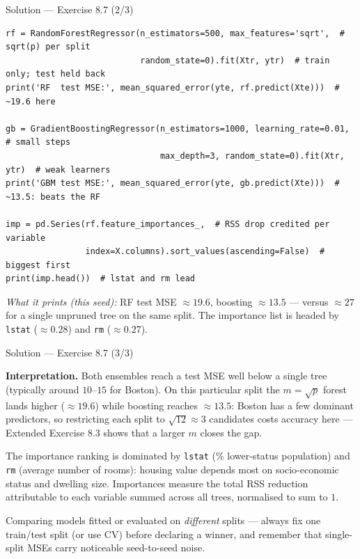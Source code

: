 \documentclass[aspectratio=169,11pt]{beamer}
\begin{document}
\begin{frame}[fragile]{Solution --- Exercise 8.7 (2/3)}
\begin{solutionbox}
\begin{lstlisting}[basicstyle=\ttfamily\scriptsize]
rf = RandomForestRegressor(n_estimators=500, max_features='sqrt',  # sqrt(p) per split
                           random_state=0).fit(Xtr, ytr)  # train only; test held back
print('RF  test MSE:', mean_squared_error(yte, rf.predict(Xte)))  # ~19.6 here

gb = GradientBoostingRegressor(n_estimators=1000, learning_rate=0.01,  # small steps
                               max_depth=3, random_state=0).fit(Xtr, ytr)  # weak learners
print('GBM test MSE:', mean_squared_error(yte, gb.predict(Xte)))  # ~13.5: beats the RF

imp = pd.Series(rf.feature_importances_,  # RSS drop credited per variable
                index=X.columns).sort_values(ascending=False)  # biggest first
print(imp.head())  # lstat and rm lead
\end{lstlisting}
\emph{What it prints (this seed):} RF test MSE $\approx19.6$, boosting $\approx13.5$ --- versus $\approx27$ for a single unpruned tree on the same split. The importance list is headed by \texttt{lstat} ($\approx0.28$) and \texttt{rm} ($\approx0.27$).
\end{solutionbox}
\end{frame}

\begin{frame}{Solution --- Exercise 8.7 (3/3)}
\begin{solutionbox}
\textbf{Interpretation.} Both ensembles reach a test MSE well below a single tree (typically around $10$--$15$ for Boston). On this particular split the $m=\sqrt p$ forest lands higher ($\approx19.6$) while boosting reaches $\approx13.5$: Boston has a few dominant predictors, so restricting each split to $\sqrt{12}\approx3$ candidates costs accuracy here --- Extended Exercise 8.3 shows that a larger $m$ closes the gap.

\medskip
The importance ranking is dominated by \texttt{lstat} (\% lower-status population) and \texttt{rm} (average number of rooms): housing value depends most on socio-economic status and dwelling size. Importances measure the total RSS reduction attributable to each variable summed across all trees, normalised to sum to $1$.
\end{solutionbox}
\begin{mistake}
Comparing models fitted or evaluated on \emph{different} splits --- always fix one train/test split (or use CV) before declaring a winner, and remember that single-split MSEs carry noticeable seed-to-seed noise.
\end{mistake}
\end{frame}
\end{document}
